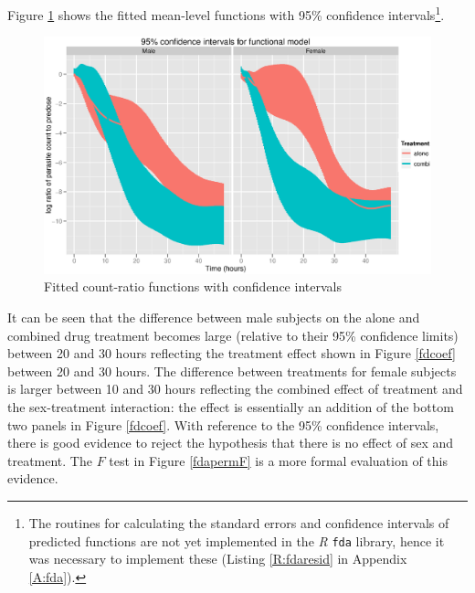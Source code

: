 Figure \ref{fdfitted} shows the fitted mean-level functions with 95\% confidence intervals\footnote{The routines for calculating the standard errors and confidence intervals of predicted functions are not yet implemented in the \emph{R} \texttt{fda} library, hence it was necessary to implement these (Listing \ref{R:fdaresid} in Appendix \ref{A:fda}).}.
\begin{figure}[p]
\includegraphics[width=150mm]{lprr2i.eps} 
\caption{Fitted count-ratio functions with confidence intervals}
\label{fdfitted}
\end{figure}
It can be seen that the difference between male subjects on the alone and combined drug treatment becomes large (relative to their 95\% confidence limits) between 20 and 30 hours reflecting the treatment effect shown in Figure \ref{fdcoef} between 20 and 30 hours. The difference between treatments for female subjects is larger between 10 and 30 hours reflecting the combined effect of treatment and the sex-treatment interaction: the effect is essentially an addition of the bottom two panels in Figure \ref{fdcoef}. With reference to the 95\% confidence intervals, there is good evidence to reject the hypothesis that there is no effect of sex and treatment. The $F$ test in Figure \ref{fdapermF} is a more formal evaluation of this evidence.

